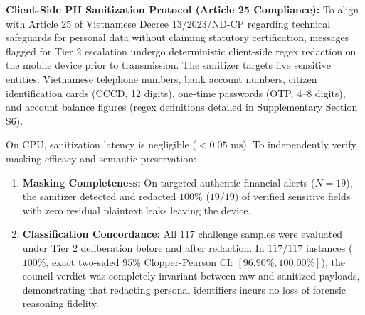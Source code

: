 \begin{table}[h]
\centering
\caption{Structured Specification Summary Across Evaluated Prompt Suites}
\label{tab:prompt_summary}
\renewcommand{\arraystretch}{0.92}
\end{table}

\textbf{Client-Side PII Sanitization Protocol (Article 25 Compliance):} To align with Article 25 of Vietnamese Decree 13/2023/ND-CP regarding technical safeguards for personal data without claiming statutory certification, messages flagged for Tier 2 escalation undergo deterministic client-side regex redaction on the mobile device prior to transmission. The sanitizer targets five sensitive entities: Vietnamese telephone numbers, bank account numbers, citizen identification cards (CCCD, 12 digits), one-time passwords (OTP, 4--8 digits), and account balance figures (regex definitions detailed in Supplementary Section S6). 

On CPU, sanitization latency is negligible ($< 0.05\text{ ms}$). To independently verify masking efficacy and semantic preservation:
\begin{enumerate}
    \item \textbf{Masking Completeness:} On targeted authentic financial alerts ($N=19$), the sanitizer detected and redacted $100\%$ ($19/19$) of verified sensitive fields with zero residual plaintext leaks leaving the device.
    \item \textbf{Classification Concordance:} All $117$ challenge samples were evaluated under Tier 2 deliberation before and after redaction. In $117 / 117$ instances ($100\%$, exact two-sided 95\% Clopper-Pearson CI: $[96.90\%, 100.00\%]$), the council verdict was completely invariant between raw and sanitized payloads, demonstrating that redacting personal identifiers incurs no loss of forensic reasoning fidelity.
\end{enumerate}